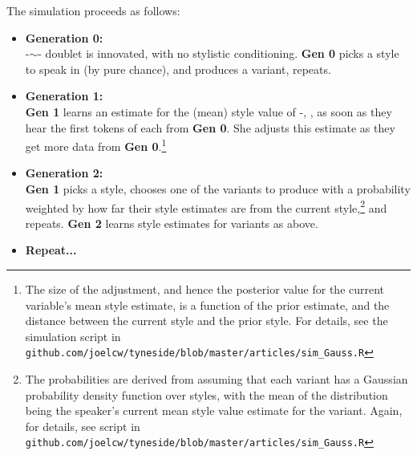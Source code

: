 The simulation proceeds as follows:

\begin{itemize}
		\item[ ]\textbf{Generation 0:}\\  -$\sim$- doublet is innovated, with no stylistic conditioning. \textbf{Gen 0} picks a style to speak in (by pure chance), and produces a variant, repeats. 
		\item[ ]\textbf{Generation 1:}\\  \textbf{Gen 1} learns an estimate for the (mean) style value of -, , as soon as they hear the first tokens of each from \textbf{Gen 0}. She adjusts this estimate as they get more data from \textbf{Gen 0}.\footnote{The size of the adjustment, and hence the posterior value for the current variable's mean style estimate, is a function of the prior estimate, and the distance between the current style and the prior style. For details, see the simulation script in \texttt{github.com/joelcw/tyneside/blob/master/articles/sim\_Gauss.R}}
		\item[ ]\textbf{Generation 2:}\\ \textbf{Gen 1} picks a style, chooses one of the variants to produce with a probability weighted by how far their style estimates are from the current style,\footnote{The probabilities are derived from assuming that each variant has a Gaussian probability density function over styles, with the mean of the distribution being the speaker's current mean style value estimate for the variant. Again, for details, see script in \texttt{github.com/joelcw/tyneside/blob/master/articles/sim\_Gauss.R}} and repeats. \textbf{Gen 2} learns style estimates for variants as above.
		\item[ ]\textbf{Repeat...}
\end{itemize}

